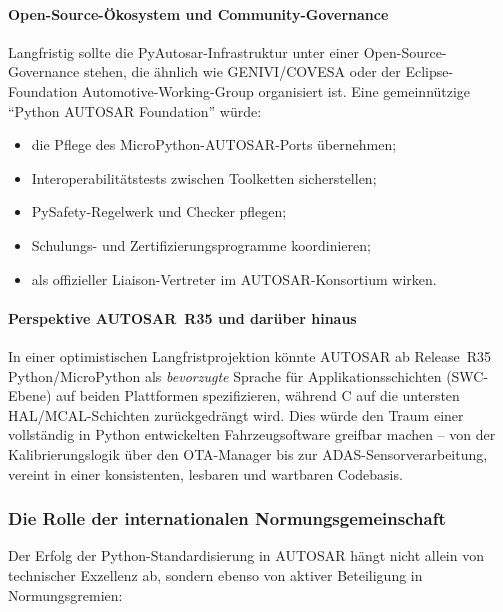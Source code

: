 ﻿\documentclass[12pt,a4paper,twoside]{article}
\begin{document}
\paragraph{Open-Source-Ökosystem und Community-Governance}
Langfristig sollte die PyAu\-tosar-Infrastruktur unter einer
Open-Source-Governance stehen, die ähnlich wie GENIVI/COVESA
oder der Eclipse-Foundation Automotive-Working-Group organisiert ist.
Eine gemeinnützige ``Python AUTOSAR Foundation'' würde:
\begin{itemize}
  \item die Pflege des MicroPython-AUTOSAR-Ports übernehmen;
  \item Interoperabilitätstests zwischen Toolketten sicherstellen;
  \item PySafety-Regelwerk und Checker pflegen;
  \item Schulungs- und Zertifizierungsprogramme koordinieren;
  \item als offizieller Liaison-Vertreter im AUTOSAR-Konsortium wirken.
\end{itemize}

\paragraph{Perspektive AUTOSAR~R35 und darüber hinaus}
In einer optimistischen Langfristprojektion könnte AUTOSAR ab Release~R35
Python/MicroPython als \emph{bevorzugte} Sprache für Applikationsschichten
(SWC-Ebene) auf beiden Plattformen spezifizieren, während C
auf die untersten HAL/MCAL-Schichten zurückgedrängt wird.
Dies würde den Traum einer vollständig in Python entwickelten
Fahrzeugsoftware greifbar machen -- von der Kalibrierungslogik über
den OTA-Manager bis zur ADAS-Sensorverarbeitung, vereint in einer
konsistenten, lesbaren und wartbaren Codebasis.

\subsubsection{Die Rolle der internationalen Normungsgemeinschaft}

Der Erfolg der Python-Standardisierung in AUTOSAR hängt nicht allein
von technischer Exzellenz ab, sondern ebenso von aktiver Beteiligung
in Normungsgremien:
\end{document}
